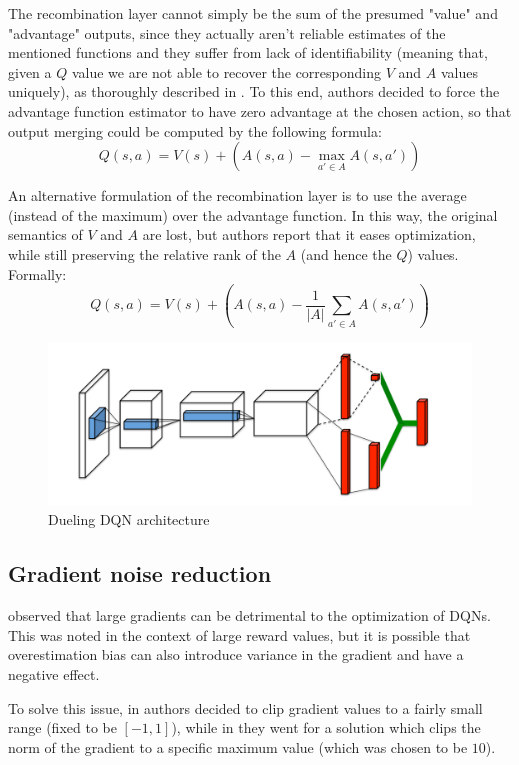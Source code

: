 \documentclass[a4paper,10pt]{report}
\begin{document}
The recombination layer cannot simply be the sum of the presumed "value" and "advantage" outputs, since they actually aren't reliable estimates of the mentioned functions and they suffer from lack of identifiability (meaning that, given a $Q$ value we are not able to recover the corresponding $V$ and $A$ values uniquely), as thoroughly described in \cite{dueling-dqn}. To this end, authors decided to force the advantage function estimator to have zero advantage at the
chosen action, so that output merging could be computed by the following formula:
$$
Q(s,a)=V(s) + \left(A(s,a) - \max_{a'\in A}A(s,a')\right)
$$

An alternative formulation of the recombination layer is to use the average (instead of the maximum) over the advantage function. In this way, the original semantics of $V$ and $A$ are lost, but authors report that it eases optimization, while still preserving the relative rank of the $A$ (and hence the $Q$) values. Formally:
$$
Q(s,a)=V(s) + \left(A(s,a) - \frac{1}{|A|}\sum_{a'\in A}A(s,a')\right)
$$

\begin{figure}[h]
	\includegraphics[width=\textwidth]{dueling-dqn.png}
	\caption{Dueling DQN architecture}
	\label{fig:dueling-dqn}
\end{figure}

\subsection{Gradient noise reduction}
\citeauthor{atari-dqn} observed that large gradients can be detrimental to the optimization of DQNs. This was noted in the context of large reward values, but it is possible that overestimation bias can also introduce variance in the gradient and have a negative effect.

To solve this issue, in \cite{atari-dqn} authors decided to clip gradient values to a fairly small range (fixed to be $[-1,1]$), while in \cite{per} they went for a solution which clips the norm of the gradient to a specific maximum value (which was chosen to be $10$).
\end{document}
